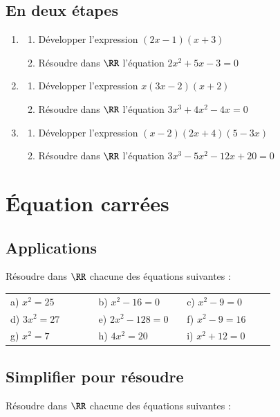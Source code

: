 \documentclass[oneside,12pt]{article}          %
\begin{document}
\subsection{En deux étapes}
\begin{enumerate}
	\item \begin{enumerate}
		\item Développer l'expression $(2x-1)(x+3)$
		\item Résoudre dans $\RR$ l'équation $2x^2+5x-3=0$
	\end{enumerate}
	\item \begin{enumerate}
		\item Développer l'expression $x(3x-2)(x+2)$
		\item Résoudre dans $\RR$ l'équation $3x^3+4x^2-4x=0$
	\end{enumerate}
	\item \begin{enumerate}
		\item Développer l'expression $(x-2)(2x+4)(5-3x)$
		\item Résoudre dans $\RR$ l'équation $3x^3-5x^2-12x+20=0$
	\end{enumerate}
\end{enumerate}




\section{Équation carrées}

\subsection{Applications}
Résoudre dans $\RR$ chacune des équations suivantes :
 
\begin{tabular}{p{0.3\linewidth} p{0.3\linewidth} p{0.3\linewidth}}
	a) $x^2=25$ & b) $x^2-16=0$ & c) $x^2-9=0$ \\
	d) $3x^2=27$ & e) $2x^2-128=0$ & f) $x^2-9=16$ \\
	g) $x^2=7$ & h) $4x^2=20$ & i) $x^2+12=0$
\end{tabular}



\subsection{Simplifier pour résoudre}
Résoudre dans $\RR$ chacune des équations suivantes :
 
\end{document}
